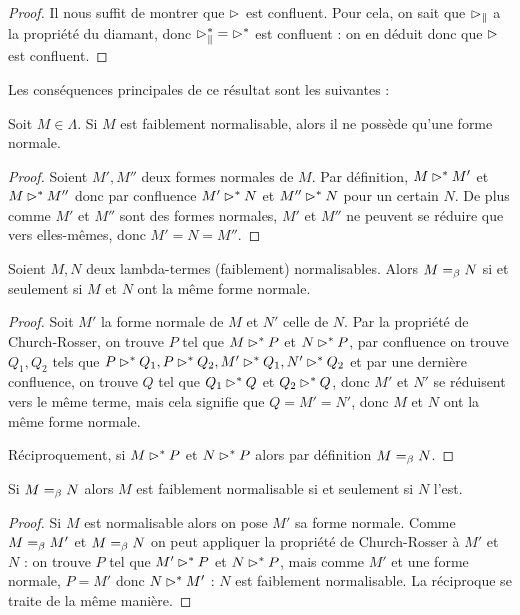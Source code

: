 \begin{proof}
    Il nous suffit de montrer que $\rhd$ est confluent. Pour cela, on sait que $\rhd_\|$ a la propriété du diamant, donc $\rhd_\|^* = \rhd^*$ est confluent : on en déduit donc que $\rhd$ est confluent.
\end{proof}

Les conséquences principales de ce résultat sont les suivantes :

\begin{prop}
    Soit $M\in\Lambda$. Si $M$ est faiblement normalisable, alors il ne possède qu'une forme normale.
\end{prop}

\begin{proof}
    Soient $M',M''$ deux formes normales de $M$. Par définition, $M\rhd^* M'$ et $M\rhd^*M''$ donc par confluence $M'\rhd^* N$ et $M''\rhd^* N$ pour un certain $N$. De plus comme $M'$ et $M''$ sont des formes normales, $M'$ et $M''$ ne peuvent se réduire que vers elles-mêmes, donc $M'=N=M''$.
\end{proof}

\begin{prop}
    Soient $M,N$ deux lambda-termes (faiblement) normalisables. Alors $M=_\beta N$ si et seulement si $M$ et $N$ ont la même forme normale.
\end{prop}

\begin{proof}
    Soit $M'$ la forme normale de $M$ et $N'$ celle de $N$. Par la propriété de Church-Rosser, on trouve $P$ tel que $M\rhd^* P$ et $N\rhd^* P$, par confluence on trouve $Q_1,Q_2$ tels que $P\rhd^* Q_1,P\rhd^* Q_2,M'\rhd^*Q_1,N'\rhd^* Q_2$ et par une dernière confluence, on trouve $Q$ tel que $Q_1\rhd^* Q$ et $Q_2\rhd^* Q$, donc $M'$ et $N'$ se réduisent vers le même terme, mais cela signifie que $Q=M'=N'$, donc $M$ et $N$ ont la même forme normale.

    Réciproquement, si $M\rhd^* P$ et $N\rhd^* P$ alors par définition $M =_\beta N$.
\end{proof}

\begin{prop}
    Si $M =_\beta N$ alors $M$ est faiblement normalisable si et seulement si $N$ l'est.
\end{prop}

\begin{proof}
    Si $M$ est normalisable alors on pose $M'$ sa forme normale. Comme $M=_\beta M'$ et $M=_\beta N$ on peut appliquer la propriété de Church-Rosser à $M'$ et $N$ : on trouve $P$ tel que $M'\rhd^* P$ et $N\rhd^* P$, mais comme $M'$ et une forme normale, $P = M'$ donc $N\rhd^* M'$ : $N$ est faiblement normalisable. La réciproque se traite de la même manière.
\end{proof}

